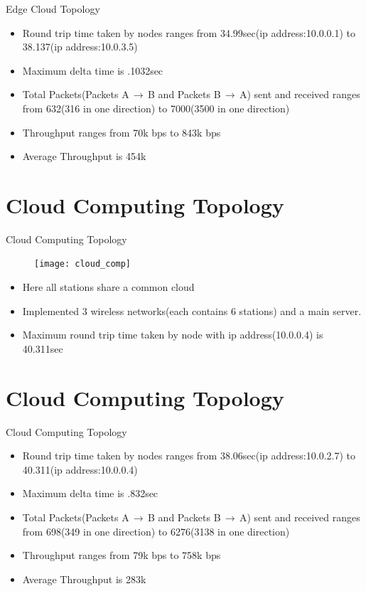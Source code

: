 \documentclass{beamer}
\begin{document}
\begin{frame}{Edge Cloud Topology}
\begin{itemize}
	\item Round trip time taken by nodes ranges from 34.99sec(ip address:10.0.0.1) to 38.137(ip address:10.0.3.5)
	\item Maximum delta time is .1032sec
	\item Total Packets(Packets A$\,\to\,$B and Packets B$\,\to\,$A) sent and received ranges from 632(316 in one direction) to 7000(3500 in one direction)
	\item Throughput ranges from 70k bps to 843k bps
	\item Average Throughput is 454k 
	

\end{itemize}
\end{frame}

\section{Cloud Computing Topology}

\begin{frame}{Cloud Computing Topology}
\begin{figure}
\texttt{[image: cloud\_comp]}
\centering
\end{figure}

\begin{itemize}
	\item Here all stations share a common cloud
	\item Implemented 3 wireless networks(each contains 6 stations) and a main server.
	\item Maximum round trip time taken by node with ip address(10.0.0.4) is 40.311sec

\end{itemize}

\end{frame}
\section{Cloud Computing Topology}

\begin{frame}{Cloud Computing Topology}
\begin{itemize}
	\item Round trip time taken by nodes ranges from 38.06sec(ip address:10.0.2.7) to 40.311(ip address:10.0.0.4)
	\item Maximum delta time is .832sec
	\item Total Packets(Packets A$\,\to\,$B and Packets B$\,\to\,$A) sent and received ranges from 698(349 in one direction) to 6276(3138 in one direction)
	\item Throughput ranges from 79k bps to 758k bps
	\item Average Throughput is 283k 
	

\end{itemize}
\end{frame}
\end{document}
